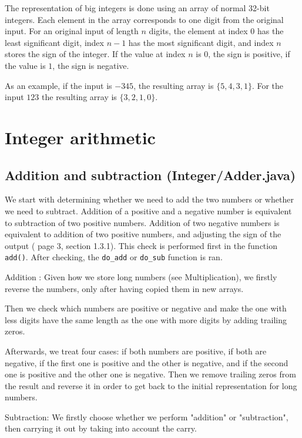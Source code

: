 \documentclass[a4paper]{article}
\begin{document}
The representation of big integers is done using an array of normal 32-bit integers.
Each element in the array corresponds to one digit from the original input.
For an original input of length $n$ digits, the element at index $0$ has the least significant digit,
index $n-1$ has the most significant digit, and index $n$ stores the sign of the integer.
If the value at index $n$ is 0, the sign is positive, if the value is $1$, the sign is negative.

As an example, if the input is $-345$, the resulting array is $\{5, 4, 3, 1\}$.
For the input $123$ the resulting array is $\{3, 2, 1, 0\}$.


\section{Integer arithmetic}

\subsection{Addition and subtraction (Integer/Adder.java)}

We start with determining whether we need to add the two numbers or whether we need to subtract.
Addition of a positive and a negative number is equivalent to subtraction of two positive numbers.
Addition of two negative numbers is equivalent to addition of two positive numbers, and adjusting the sign of the output
(\cite{ant} page 3, section 1.3.1).
This check is performed first in the function \texttt{add()}.
After checking, the \texttt{do\_add} or \texttt{do\_sub} function is ran.

Addition : Given how we store long numbers (see Multiplication), we firstly reverse the numbers, only after having copied them in new arrays. 

Then we check which numbers are positive or negative and make the  one with less digits have the same length as the one with more digits by adding trailing zeros. 

Afterwards, we treat four cases: if both numbers are positive, if both are negative, if the first one is positive and the other is negative, and if the second one is positive and the other one is negative. Then we remove trailing zeros from the result and reverse it in order to get back to the initial representation for long numbers.

Subtraction: We firstly choose whether we perform "addition"  or "subtraction", then carrying it out by taking into account the carry. 
\end{document}
